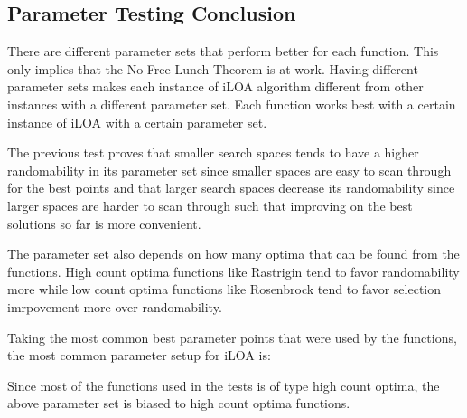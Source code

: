 \subsection{Parameter Testing Conclusion}
\par There are different parameter sets that perform better for each function. This only implies that the No Free Lunch Theorem is at work. Having different parameter sets makes each instance of iLOA algorithm different from other instances with a different parameter set. Each function works best with a certain instance of iLOA with a certain parameter set.

\par The previous test proves that smaller search spaces tends to have a higher randomability in its parameter set since smaller spaces are easy to scan through for the best points and that larger search spaces decrease its randomability since larger spaces are harder to scan through such that improving on the best solutions so far is more convenient.

\par The parameter set also depends on how many optima that can be found from the functions. High count optima functions like Rastrigin tend to favor randomability more while low count optima functions like Rosenbrock tend to favor selection imrpovement more over randomability.

\par Taking the most common best parameter points that were used by the functions, the most common parameter setup for iLOA is:


\par Since most of the functions used in the tests is of type high count optima, the above parameter set is biased to high count optima functions.
